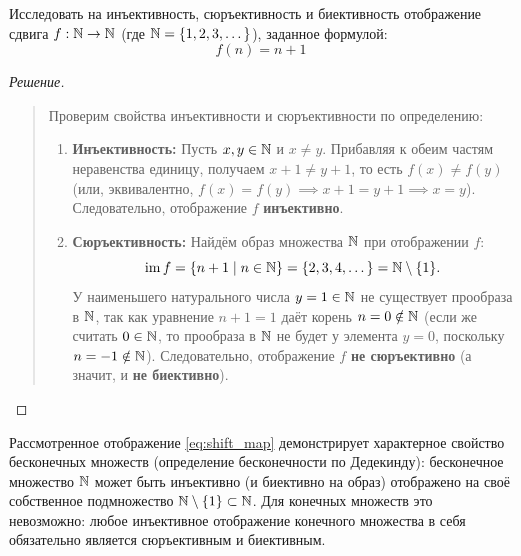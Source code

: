 \begin{problem}
    Исследовать на инъективность, сюръективность и биективность отображение 
    сдвига $f: \mathbb{N} \to \mathbb{N}$ (где $\mathbb{N} = \{1, 2, 3, \dots\}$), заданное формулой:
    \begin{equation} \label{eq:shift_map}
        f(n) = n + 1 \tag{9}
    \end{equation}
\end{problem}

\begin{proof}[Решение]~\\
    \begin{quote}
        Проверим свойства инъективности и сюръективности по определению:
        \begin{enumerate}
            \item \textbf{Инъективность:} Пусть $x, y \in \mathbb{N}$ и $x \neq y$. 
            Прибавляя к обеим частям неравенства единицу, получаем 
            $x + 1 \neq y + 1$, то есть $f(x) \neq f(y)$ (или, 
            эквивалентно, $f(x) = f(y) \implies x + 1 = y + 1 \implies x = y$). 
            Следовательно, отображение $f$ \textbf{инъективно}.
            \item \textbf{Сюръективность:} Найдём образ множества $\mathbb{N}$ при 
            отображении $f$:
            \[
                \operatorname{im} f = \{n + 1 \mid n \in \mathbb{N}\} = \{2, 3, 4, \dots\} = 
                \mathbb{N} \setminus \{1\}.
            \]
            У наименьшего натурального числа $y = 1 \in \mathbb{N}$ не существует 
            прообраза в $\mathbb{N}$, так как уравнение $n + 1 = 1$ даёт корень 
            $n = 0 \notin \mathbb{N}$ (если же считать $0 \in \mathbb{N}$, то прообраза в 
            $\mathbb{N}$ не будет у элемента $y = 0$, поскольку $n = -1 \notin \mathbb{N}$). 
            Следовательно, отображение $f$ \textbf{не сюръективно} 
            (а значит, и \textbf{не биективно}).
        \end{enumerate}
    \end{quote}
\end{proof}

\begin{remark}
    Рассмотренное отображение \eqref{eq:shift_map} демонстрирует 
    характерное свойство бесконечных множеств (определение бесконечности по 
    Дедекинду): бесконечное множество $\mathbb{N}$ может быть инъективно (и 
    биективно на образ) отображено на своё собственное подмножество 
    $\mathbb{N} \setminus \{1\} \subset \mathbb{N}$. Для конечных множеств это невозможно: 
    любое инъективное отображение конечного множества в себя обязательно 
    является сюръективным и биективным.
\end{remark}
